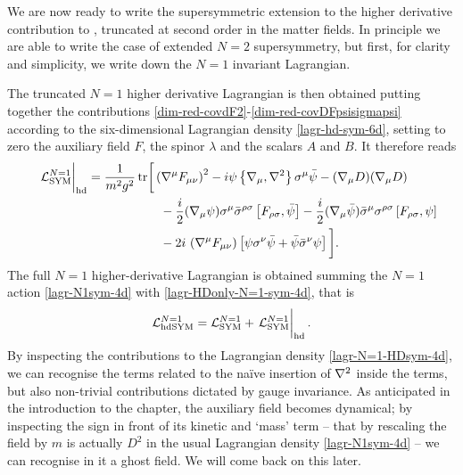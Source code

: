 We are now ready to write the supersymmetric extension to the higher derivative contribution to \sym{}, truncated at second order in the matter fields. In principle we are able to write the case of extended $N=2$ supersymmetry, but first, for clarity and simplicity, we write down the $N=1$ invariant Lagrangian. 





The truncated  $N=1$ higher derivative Lagrangian  is then obtained putting together the contributions
\eqref{dim-red-covdF2}-\eqref{dim-red-covDFpsisigmapsi} according to the six-dimensional Lagrangian density \eqref{lagr-hd-sym-6d}, setting to zero the auxiliary field $F$, the spinor $\lambda$ and the scalars $A$ and $B$. 
It therefore reads
\begin{equation}\label{lagr-HDonly-N=1-sym-4d}
\begin{split}
\left.\phantom{\int}{ \mathcal{L} }^{N=1}_{{ \text{SYM} }}\right|_{{ \text{hd} }}
	=
 \frac{1}{m^2 g^2}
 \operatorname{tr} &\bigg[
		\left( { \mathcal{\nabla} }^\mu F_{\mu\nu} \right)^2
		- i \psi \left\{ { \mathcal{\nabla} }_\mu, { \mathcal{\nabla} }^2 \right\}
			\sigma^\mu \bar \psi
		- ( { \mathcal{\nabla} }_\mu D ) ( { \mathcal{\nabla} }_\mu D )
\\
& \quad
		-\frac{i}{2} 
			({ \mathcal{\nabla} }_\mu \psi) \sigma^\mu \bar \sigma^{\rho \sigma}
			\left[ F_{ \rho \sigma } , 	 \bar \psi \right]
		- \frac{i}{2}
			({ \mathcal{\nabla} }_\mu \bar \psi) \bar \sigma^\mu \sigma^{\rho \sigma}
			\left[ F_{ \rho \sigma } ,  \psi \right]
\\
& \quad
		- 2 i\ ( { \mathcal{\nabla} }^\mu F_{ \mu \nu } ) 
			\left[
			 \psi \sigma^\nu \bar \psi 
				+ \bar \psi \bar \sigma^\nu \psi 
		\right]
\bigg].
\end{split}
\end{equation}
The full $N=1$ higher-derivative \sym{} Lagrangian is obtained  summing  the $N=1$ \sym{} action \eqref{lagr-N1sym-4d} with \eqref{lagr-HDonly-N=1-sym-4d}, that is
\begin{equation}\label{lagr-N=1-HDsym-4d}
{ \mathcal{L} }^{N=1}_{{ \text{hd} }{ \text{SYM} }}
	=
{ \mathcal{L} }^{N=1}_{ \text{SYM} } 
+
\left.\phantom{\int}\hspace{-1em}{ \mathcal{L} }^{N=1}_{{ \text{SYM} }}\right|_{{ \text{hd} }}.
\end{equation}
 By inspecting the contributions to the Lagrangian density \eqref{lagr-N=1-HDsym-4d}, we can recognise the terms related to the na\"ive insertion of ${ \mathcal{\nabla} }^2$ inside the terms, but also non-trivial contributions dictated by gauge invariance. As anticipated in the introduction to the chapter, the auxiliary field becomes dynamical; by inspecting the sign in front of its kinetic and `mass' term -- that by rescaling the field by $m$ is actually $D^2$ in the usual \sym{} Lagrangian density \eqref{lagr-N1sym-4d} -- we can recognise in it a ghost field. We will come back on this later.





